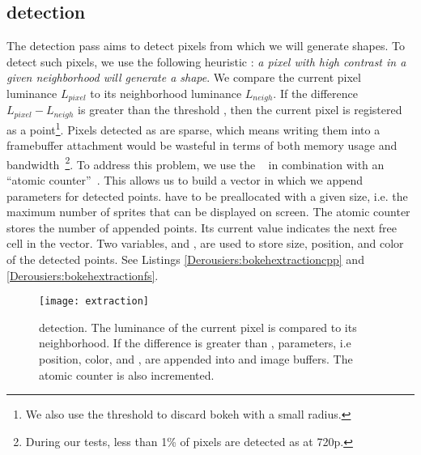 \subsection{\Bokeh detection}
The detection pass aims to detect pixels from which we will generate \bokeh shapes. To detect such pixels, we use the following heuristic : \emph{a pixel with high contrast in a given neighborhood will generate a \bokeh shape}. We compare the current pixel luminance $L_{pixel}$ to its neighborhood luminance $L_{neigh}$. If the difference $L_{pixel}-L_{neigh}$ is greater than the threshold , then the current pixel is registered as a \bokeh point\footnote{We also use the threshold  to discard bokeh with a small radius.}. Pixels detected as \bokeh are sparse, which means writing them into a framebuffer attachment would be wasteful in terms of both memory usage and bandwidth~\footnote{During our tests, less than 1\% of pixels are detected as \bokeh at 720p.}. To address this problem, we use the \opengl {}~\cite{ImageLoadStore11} in combination with an ``atomic counter''~\cite{AtomicCounters11}. This allows us to build a vector in which we append parameters for detected \bokeh points.  have to be preallocated with a given size, i.e. the maximum number of \bokeh sprites that can be displayed on screen. The atomic counter  stores the number of appended \bokeh points. Its current value indicates the next free cell in the  vector. Two  variables,  and , are used to store \coc size, position, and color of the detected \bokeh points. See Listings \ref{Derousiers:bokehextractioncpp} and \ref{Derousiers:bokehextractionfs}.

	\begin{figure}[htb]\centering
	\texttt{[image: extraction]}
	\caption{\Bokeh detection. The luminance of the current pixel is compared to its neighborhood. If the difference is greater than , \bokeh parameters, i.e position, color, and \coc, are appended into  and  image buffers. The atomic counter  is also incremented.}
	\label{Derousiers:detection}
	\end{figure}

